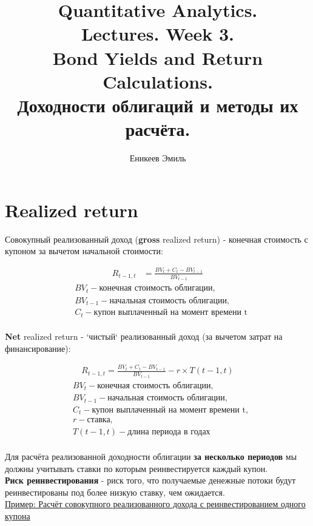 \documentclass{article}
\title{Quantitative Analytics.\\
Lectures. Week 3. \\
Bond Yields and Return Calculations.
\\
Доходности облигаций и методы их расчёта.}
\author{Еникеев Эмиль}
\begin{document}
\maketitle

\setcounter{tocdepth}{1} %
\renewcommand\contentsname{Contents}
\tableofcontents
\newpage

\renewcommand{\labelitemi}{\tiny$\bullet$}
\renewcommand{\figurename}{Fig.}

 \section{Realized return}

Совокупный реализованный доход (\textbf{gross} realized return) - конечная стоимость с купоном за вычетом начальной стоимости:


\begin{align*}
    R_{t-1,t} &= \frac{BV_{t} + C_{t}-BV_{t-1}}{BV_{t-1}}
\end{align*}
\begin{align*}
& BV_{t}  - \text{конечная стоимость облигации},
\\
& BV_{t-1} - \text{начальная стоимость облигации},      
\\
& C_{t} - \text{купон выплаченный на момент времени t}
\end{align*}
\\
\textbf{Net} realized return - `чистый` реализованный доход (за вычетом затрат на финансирование):

\begin{align*}
    R_{t-1,t} = \frac{BV_{t} + C_{t}-BV_{t-1}}{BV_{t-1}} - r\times T(t-1,t)
\end{align*}
\begin{align*}
& BV_{t}  - \text{конечная стоимость облигации},
\\
& BV_{t-1} - \text{начальная стоимость облигации},      
\\
& C_{t} - \text{купон выплаченный на момент времени t},
\\
& r - \text{ставка},
\\
& T(t-1,t) - \text{длина периода в годах}
\end{align*}
\\
Для расчёта реализованной доходности облигации \textbf{за несколько периодов} мы должны учитывать ставки по которым реинвестируется каждый купон.
\\
\textbf{Риск реинвестирования} - риск того, что получаемые денежные потоки будут реинвестированы под более низкую ставку, чем ожидается.
\\
\underline{Пример: Расчёт совокупного реализованного дохода с реинвестированием одного купона}
\end{document}
